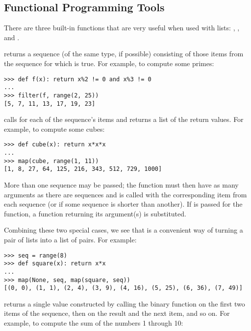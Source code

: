 \documentclass{manual}
\begin{document}
\subsection{Functional Programming Tools}
\label{functional}

There are three built-in functions that are very useful when used with
lists: , , and .

 returns a sequence (of
the same type, if possible) consisting of those items from the
sequence for which  is true.  For
example, to compute some primes:

\begin{verbatim}
>>> def f(x): return x%2 != 0 and x%3 != 0
...
>>> filter(f, range(2, 25))
[5, 7, 11, 13, 17, 19, 23]
\end{verbatim}

 calls
 for each of the sequence's items and
returns a list of the return values.  For example, to compute some
cubes:

\begin{verbatim}
>>> def cube(x): return x*x*x
...
>>> map(cube, range(1, 11))
[1, 8, 27, 64, 125, 216, 343, 512, 729, 1000]
\end{verbatim}

More than one sequence may be passed; the function must then have as
many arguments as there are sequences and is called with the
corresponding item from each sequence (or  if some sequence
is shorter than another).  If  is passed for the function,
a function returning its argument(s) is substituted.

Combining these two special cases, we see that
 is a convenient way of
turning a pair of lists into a list of pairs.  For example:

\begin{verbatim}
>>> seq = range(8)
>>> def square(x): return x*x
...
>>> map(None, seq, map(square, seq))
[(0, 0), (1, 1), (2, 4), (3, 9), (4, 16), (5, 25), (6, 36), (7, 49)]
\end{verbatim}

 returns a single value
constructed by calling the binary function  on the first two
items of the sequence, then on the result and the next item, and so
on.  For example, to compute the sum of the numbers 1 through 10:
\end{document}
